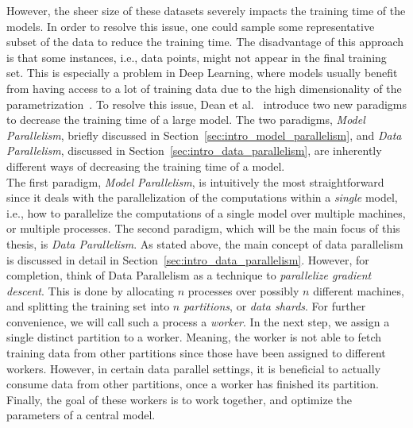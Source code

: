 However, the sheer size of these datasets severely impacts the training time of the models. In order to resolve this issue, one could sample some representative subset of the data to reduce the training time. The disadvantage of this approach is that some instances, i.e., data points, might not appear in the final training set. This is especially a problem in Deep Learning, where models usually benefit from having access to a lot of training data due to the high dimensionality of the parametrization~\cite{dean2012large}. To resolve this issue, Dean et al.~\cite{dean2012large} introduce two new paradigms to decrease the training time of a large model. The two paradigms, \emph{Model Parallelism}, briefly discussed in Section~\ref{sec:intro_model_parallelism}, and \emph{Data Parallelism}, discussed in Section~\ref{sec:intro_data_parallelism}, are inherently different ways of decreasing the training time of a model.\\

The first paradigm, \emph{Model Parallelism}, is intuitively the most straightforward since it deals with the parallelization of the computations within a \emph{single} model, i.e., how to parallelize the computations of a single model over multiple machines, or multiple processes. The second paradigm, which will be the main focus of this thesis, is \emph{Data Parallelism}. As stated above, the main concept of data parallelism is discussed in detail in Section~\ref{sec:intro_data_parallelism}. However, for completion, think of Data Parallelism as a technique to \emph{parallelize gradient descent}. This is done by allocating $n$ processes over possibly $n$ different machines, and splitting the training set into $n$ \emph{partitions}, or \emph{data shards}. For further convenience, we will call such a process a \emph{worker}. In the next step, we assign a single distinct partition to a worker. Meaning, the worker is not able to fetch training data from other partitions since those have been assigned to different workers. However, in certain data parallel settings, it is beneficial to actually consume data from other partitions, once a worker has finished its partition. Finally, the goal of these workers is to work together, and optimize the parameters of a central model.\\

